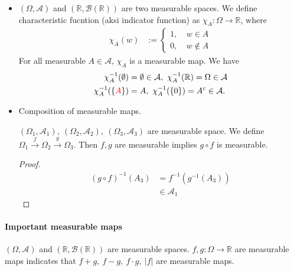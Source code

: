 \documentclass[../../note.tex]{subfiles}
\begin{document}
\begin{example}
    \begin{itemize}
        \item $(\Omega, \mathcal{A})$ and $(\mathbb{R}, \mathcal{B}(\mathbb{R}))$ are two measurable spaces. We define characteristic fucntion (aksi indicator function) as $\chi_{A}:\Omega \rightarrow \mathbb{R}$, where
        \begin{align}
            \chi_{A}(w)
            &:= \left\{
                \begin{matrix}
                    1,~& w \in A \\
                    0,~& w \notin A
                \end{matrix}
            \right.
        \end{align}
        For all measurable $A \in \mathcal{A}$, $\chi_A$ is a measurable map. We have
        \begin{align}
            \chi_A^{-1}(\emptyset) 
            &= \emptyset \in \mathcal{A},~ \chi_A^{-1}(\mathbb{R}) = \Omega \in \mathcal{A} \\
            \chi_A^{-1}(\left\{\textcolor{red}{A}\right\}) 
            &= A,~ \chi_A^{-1}(\left\{0\right\}) = A^c \in \mathcal{A}.
        \end{align}
        \item Composition of measurable maps. 
        \begin{lemma}
            $(\Omega_1, \mathcal{A}_1),~(\Omega_2, \mathcal{A}_2),~(\Omega_3, \mathcal{A}_3)$ are measurable space. We define $\Omega_1 \stackrel{f}{\rightarrow}\Omega_2 \stackrel{g}{\rightarrow} \Omega_3$. Then $f,g$ are measurable implies $g \circ f$ is measurable.
        \end{lemma}
        \begin{proof}
            \begin{align}
                (g \circ f)^{-1}(A_3)
                &= f^{-1}(g^{-1}(A_3)) \\
                &\in \mathcal{A}_1
            \end{align}
        \end{proof}
    \end{itemize}
\end{example}

\paragraph{Important measurable maps}
\begin{lemma}
    $(\Omega,\mathcal{A})$ and $(\mathbb{R}, \mathcal{B}(\mathbb{R}))$ are measurable spaces. $f,g: \Omega \rightarrow \mathbb{R}$ are measurable maps indicates that $f+g,~f-g,~f \cdot g,~\vert f \vert$ are measurable maps.
\end{lemma}
\end{document}
